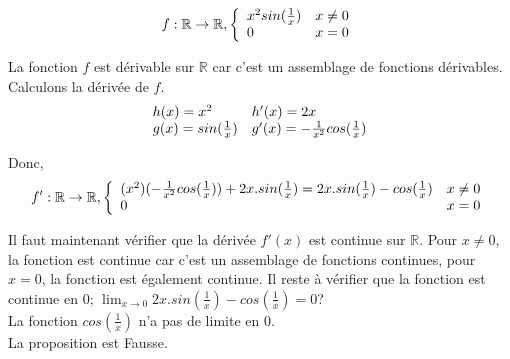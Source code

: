 \documentclass[]{book}
\theoremstyle{definition}
\newcommand{\bb}[1]{\mathbb{#1}}
\newcommand{\R}{\bb{R}}
\begin{document}
$$f: \R \to \R,
\left\{ 
\begin{array}{l l}
 x^2sin(\frac{1}{x}) & x \neq 0\\
 0 & x = 0\\
\end{array}
\right. 
$$

La fonction $f$ est d\'erivable sur $\R$ car c'est un assemblage de fonctions d\'erivables. Calculons la d\'eriv\'ee de $f$.
$$
\begin{array}{l l}
 h(x) = x^2 & h'(x)= 2x\\
 g(x) = sin(\frac{1}{x}) & g'(x)= -\frac{1}{x^2}cos(\frac{1}{x})\\
\end{array}
$$

Donc,
$$f': \R \to \R,
\left\{ 
\begin{array}{l l}
 (x^2)(-\frac{1}{x^2}cos(\frac{1}{x})) + 2x.sin(\frac{1}{x}) = 2x.sin(\frac{1}{x}) - cos(\frac{1}{x})& x \neq 0\\
 0 & x = 0\\
\end{array}
\right. 
$$

Il faut maintenant v\'erifier que la d\'eriv\'ee $f'(x)$ est continue sur $\R$. Pour $x \neq 0$, la fonction est continue car c'est un assemblage de fonctions continues, pour $x=0$, la fonction est \'egalement continue. Il reste \`a v\'erifier que la fonction est continue en $0$; $\lim_{x \to 0} 2x.sin(\frac{1}{x}) - cos(\frac{1}{x}) = 0$?\\

La fonction $cos(\frac{1}{x})$ n'a pas de limite en $0$.\\

La proposition est Fausse.
\end{document}
